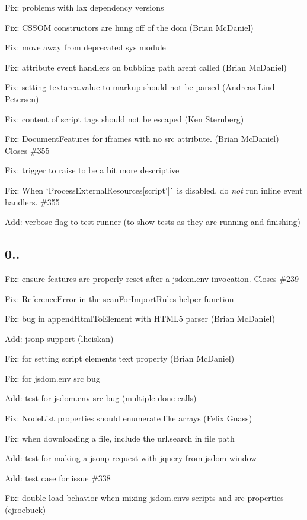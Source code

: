 \begin{DoxyItemize}
\item Fix\+: problems with lax dependency versions
\item Fix\+: C\+S\+S\+OM constructors are hung off of the dom (Brian Mc\+Daniel)
\item Fix\+: move away from deprecated \textquotesingle{}sys\textquotesingle{} module
\item Fix\+: attribute event handlers on bubbling path aren\textquotesingle{}t called (Brian Mc\+Daniel)
\item Fix\+: setting textarea.\+value to markup should not be parsed (Andreas Lind Petersen)
\item Fix\+: content of script tags should not be escaped (Ken Sternberg)
\item Fix\+: Document\+Features for iframes with no src attribute. (Brian Mc\+Daniel) Closes \#355
\item Fix\+: \textquotesingle{}trigger\textquotesingle{} to \textquotesingle{}raise\textquotesingle{} to be a bit more descriptive
\item Fix\+: When `Process\+External\+Resources\mbox{[}\textquotesingle{}script'\mbox{]}\`{} is disabled, do {\itshape not} run inline event handlers. \#355
\item Add\+: verbose flag to test runner (to show tests as they are running and finishing)
\end{DoxyItemize}

\subsection*{0..}


\begin{DoxyItemize}
\item Fix\+: ensure features are properly reset after a jsdom.\+env invocation. Closes \#239
\item Fix\+: Reference\+Error in the scan\+For\+Import\+Rules helper function
\item Fix\+: bug in append\+Html\+To\+Element with H\+T\+M\+L5 parser (Brian Mc\+Daniel)
\item Add\+: jsonp support (lheiskan)
\item Fix\+: for setting script element\textquotesingle{}s text property (Brian Mc\+Daniel)
\item Fix\+: for jsdom.\+env src bug
\item Add\+: test for jsdom.\+env src bug (multiple done calls)
\item Fix\+: Node\+List properties should enumerate like arrays (Felix Gnass)
\item Fix\+: when downloading a file, include the url.\+search in file path
\item Add\+: test for making a jsonp request with jquery from jsdom window
\item Add\+: test case for issue \#338
\item Fix\+: double load behavior when mixing jsdom.\+env\textquotesingle{}s {\ttfamily scripts} and {\ttfamily src} properties (cjroebuck)
\end{DoxyItemize}

